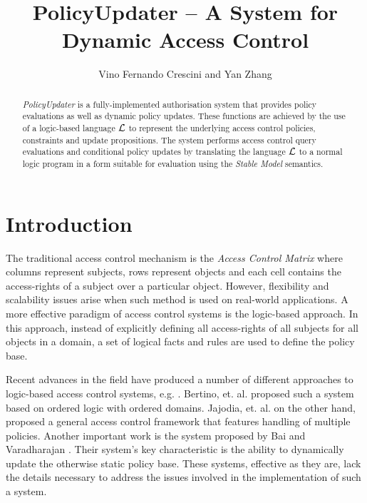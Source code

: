 \documentclass[global,twocolumn,final]{svjour}
\begin{document}
  \title{PolicyUpdater -- A System for Dynamic Access Control}
  \author{Vino Fernando Crescini and Yan Zhang}

  \maketitle

  \begin{abstract}
    {\em PolicyUpdater} is a fully-implemented authorisation system that
    provides policy evaluations as well as dynamic policy updates. These
    functions are achieved by the use of a logic-based language ${\cal L}$ to
    represent the underlying access control policies, constraints and update
    propositions. The system performs access control query evaluations and
    conditional policy updates by translating the language $\cal{L}$ to a
    normal logic program in a form suitable for evaluation using the
    {\em Stable Model} semantics.
  \end{abstract}

  \section{Introduction}

    The traditional access control mechanism is the {\em Access Control Matrix}
    where columns represent subjects, rows represent objects and each cell
    contains the access-rights of a subject over a particular object. However,
    flexibility and scalability issues arise when such method is used on
    real-world applications. A more effective paradigm of access control
    systems is the logic-based approach. In this approach, instead of
    explicitly defining all access-rights of all subjects for all objects
    in a domain, a set of logical facts and rules are used to define the
    policy base.

    Recent advances in the field have produced a number of different approaches
    to logic-based access control systems, e.g. \cite{HAL,LI}. Bertino, et. al.
    \cite{BE1} proposed such a system based on ordered logic with ordered
    domains. Jajodia, et. al. \cite{JAJ} on the other hand, proposed a general
    access control framework that features handling of multiple policies.
    Another important work is the system proposed by Bai and Varadharajan
    \cite{BA1,BA2}. Their system's key characteristic is the ability to
    dynamically update the otherwise static policy base. These systems,
    effective as they are, lack the details necessary to address the issues
    involved in the implementation of such a system.
\end{document}
